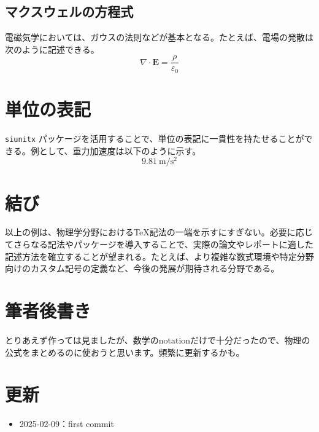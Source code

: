 \documentclass{ltjsarticle}
\begin{document}
\subsection{マクスウェルの方程式}
電磁気学においては、ガウスの法則などが基本となる。たとえば、電場の発散は次のように記述できる。
\[
\nabla \cdot \mathbf{E} = \frac{\rho}{\varepsilon_0}
\]

\section{単位の表記}
\texttt{siunitx} パッケージを活用することで、単位の表記に一貫性を持たせることができる。例として、重力加速度は以下のように示す。
\[
\SI{9.81}{\meter\per\second\squared}
\]

\section{結び}
以上の例は、物理学分野における\TeX 記法の一端を示すにすぎない。必要に応じてさらなる記法やパッケージを導入することで、実際の論文やレポートに適した記述方法を確立することが望まれる。たとえば、より複雑な数式環境や特定分野向けのカスタム記号の定義など、今後の発展が期待される分野である。

\section{筆者後書き}
とりあえず作っては見ましたが、数学のnotationだけで十分だったので、物理の公式をまとめるのに使おうと思います。頻繁に更新するかも。

\section{更新}
\begin{itemize}
    \item 2025-02-09：first commit
  \end{itemize}
\end{document}
